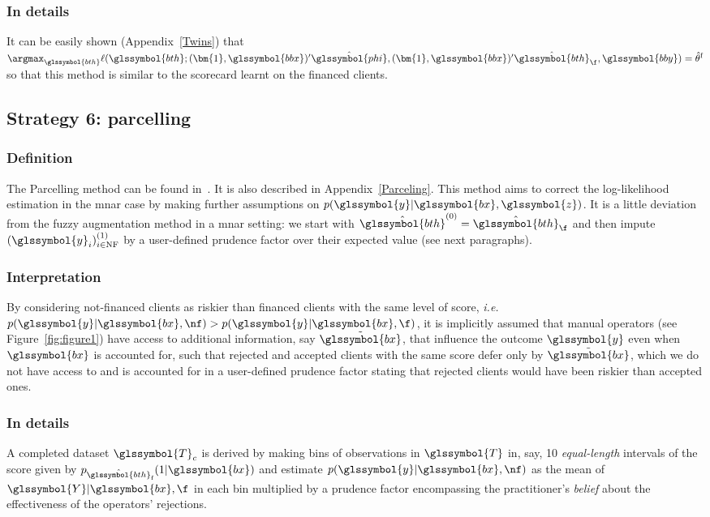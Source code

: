 \subsubsection{In details}
It can be easily shown (Appendix~\ref{Twins}) that $\argmax_{\glssymbol{bth}} \ell(\glssymbol{bth};(\bm{1},\glssymbol{bbx})' \hat{\glssymbol{phi}}, (\bm{1},\glssymbol{bbx})' \hat{\glssymbol{bth}}_\f, \glssymbol{bby}) = \hat{\theta}^{\text{f}}$ so that this method is similar to the scorecard learnt on the financed clients.

\subsection{Strategy 6: parcelling} \label{subsec:parcel}

\subsubsection{Definition}
The Parcelling method can be found in~\cite{saporta,banasik,RI6}. It is also described in Appendix~\ref{Parceling}. This method aims to correct the log-likelihood estimation in the \gls{mnar} case by making further assumptions on $p(\glssymbol{y} | \glssymbol{bx}, \glssymbol{z})$. It is a little deviation from the fuzzy augmentation method in a \gls{mnar} setting: we start with $\hat{\glssymbol{bth}}^{(0)} = \hat{\glssymbol{bth}}_\f$ and then impute $(\glssymbol{y}_i)_{i \in \text{NF}}^{(1)}$ by a user-defined prudence factor over their expected value (see next paragraphs).

\subsubsection{Interpretation}
By considering not-financed clients as riskier than financed clients with the same level of \gls{score}, \textit{i.e.}\ $p(\glssymbol{y} | \glssymbol{bx}, \nf) > p(\glssymbol{y} | \glssymbol{bx}, \f)$, it is implicitly assumed that manual operators (see Figure~\ref{fig:figure1}) have access to additional information, say $\tilde{\glssymbol{bx}}$, that influence the outcome $\glssymbol{y}$ even when $\glssymbol{bx}$ is accounted for, such that rejected and accepted clients with the same \gls{score} defer only by $\tilde{\glssymbol{bx}}$, which we do not have access to and is accounted for in a user-defined prudence factor stating that rejected clients would have been riskier than accepted ones.

\subsubsection{In details}
A completed dataset $\glssymbol{T}_c$ is derived by making bins of observations in $\glssymbol{T}$ in, say, 10 \textit{equal-length} intervals of the \gls{score} given by $p_{\hat{\glssymbol{bth}}_\text{f}}(1 | \glssymbol{bx})$ and estimate $p(\glssymbol{y} | \glssymbol{bx}, \nf)$ as the mean of $\glssymbol{Y} | \glssymbol{bx}, \f$ in each bin multiplied by a prudence factor encompassing the practitioner's \textit{belief} about the effectiveness of the operators' rejections.

